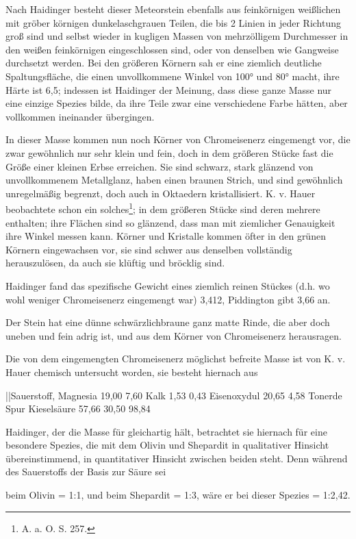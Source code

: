 \documentclass[a4paper, 11pt, oneside]{article}
\begin{document}
Nach Haidinger besteht dieser Meteorstein ebenfalls aus feinkörnigen weißlichen mit gröber körnigen dunkelaschgrauen Teilen, die bis 2 Linien in jeder Richtung groß sind und selbst wieder in kugligen Massen von mehrzölligem Durchmesser in den weißen feinkörnigen eingeschlossen sind, oder von denselben wie Gangweise durchsetzt werden. Bei den größeren Körnern sah er eine ziemlich deutliche Spaltungsfläche, die einen unvollkommene Winkel von 100° und 80° macht, ihre Härte ist 6,5; indessen ist Haidinger der Meinung, dass diese ganze Masse nur eine einzige Spezies bilde, da ihre Teile zwar eine verschiedene Farbe hätten, aber vollkommen ineinander übergingen.

In dieser Masse kommen nun noch Körner von Chromeisenerz eingemengt vor, die zwar gewöhnlich nur sehr klein und fein, doch in dem größeren Stücke fast die Größe einer kleinen Erbse erreichen. Sie sind schwarz, stark glänzend von unvollkommenem Metallglanz, haben einen braunen Strich, und sind gewöhnlich unregelmäßig begrenzt, doch auch in Oktaedern kristallisiert. K. v. Hauer beobachtete schon ein solches\footnote{A. a. O. S. 257.}; in dem größeren Stücke sind deren mehrere enthalten; ihre Flächen sind so glänzend, dass man mit ziemlicher Genauigkeit ihre Winkel messen kann. Körner und Kristalle kommen öfter in den grünen Körnern eingewachsen vor, sie sind schwer aus denselben vollständig herauszulösen, da auch sie klüftig und bröcklig sind.

Haidinger fand das spezifische Gewicht eines ziemlich reinen Stückes (d.h. wo wohl weniger Chromeisenerz eingemengt war) 3,412, Piddington gibt 3,66 an.

Der Stein hat eine dünne schwärzlichbraune ganz matte Rinde, die aber doch uneben und fein adrig ist, und aus dem Körner von Chromeisenerz herausragen.

Die von dem eingemengten Chromeisenerz möglichst befreite Masse ist von K. v. Hauer chemisch untersucht worden, sie besteht hiernach aus

||Sauerstoff,  
Magnesia 19,00 7,60  
Kalk 1,53 0,43  
Eisenoxydul 20,65 4,58  
Tonerde Spur  
Kieselsäure 57,66 30,50  
98,84

Haidinger, der die Masse für gleichartig hält, betrachtet sie hiernach für eine besondere Spezies, die mit dem Olivin und Shepardit in qualitativer Hinsicht übereinstimmend, in quantitativer Hinsicht zwischen beiden steht. Denn während des Sauerstoffs der Basis zur Säure sei

beim Olivin = 1:1, und  
beim Shepardit = 1:3, wäre er  
bei dieser Spezies = 1:2,42.  
\end{document}
